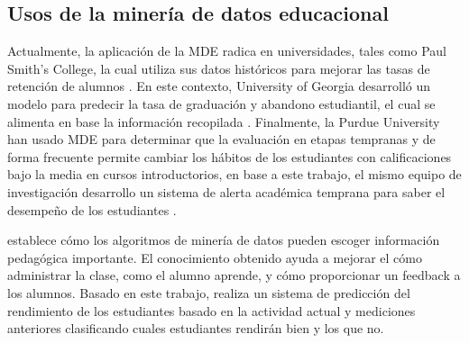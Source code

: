 \subsection{Usos de la minería de datos educacional}


Actualmente, la aplicación de la MDE radica en universidades, tales como Paul Smith’s College, la cual utiliza sus datos históricos para mejorar las tasas de retención de alumnos \parencite{bichsel2012analytics}. En este contexto, University of Georgia desarrolló un modelo para predecir la tasa de graduación y abandono estudiantil, el cual se alimenta en base la información recopilada \parencite{morris2005predicting}. Finalmente, la Purdue University han usado MDE para determinar que la evaluación en etapas tempranas y de forma frecuente permite cambiar los hábitos de los estudiantes con calificaciones bajo la media en cursos introductorios, en base a este trabajo, el mismo equipo de investigación desarrollo un sistema de alerta académica temprana para saber el desempeño de los estudiantes \parencite{baepler2010academic}. 

\textcite{merceron2005educational} establece cómo los algoritmos de minería de datos pueden escoger información pedagógica importante. El conocimiento obtenido ayuda a mejorar el cómo administrar la clase, como el alumno aprende, y cómo proporcionar un feedback a los alumnos. Basado en este trabajo, \textcite{abdullah2014students} realiza un sistema de predicción del rendimiento de los estudiantes basado en la actividad actual y mediciones anteriores clasificando cuales estudiantes rendirán bien y los que no. 



